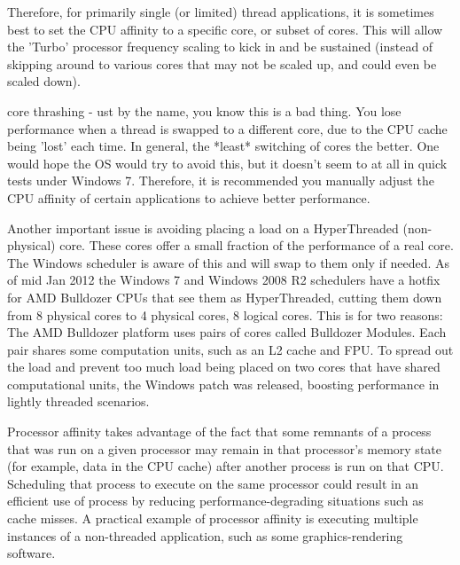 \documentclass[final_report.tex]{subfiles}
\begin{document}
Therefore, for primarily single (or limited) thread applications, it is sometimes best to set the CPU affinity to a specific core, or subset of cores. This will allow the 'Turbo' processor frequency scaling to kick in and be sustained (instead of skipping around to various cores that may not be scaled up, and could even be scaled down).

core thrashing - ust by the name, you know this is a bad thing. You lose performance when a thread is swapped to a different core, due to the CPU cache being 'lost' each time. In general, the *least* switching of cores the better. One would hope the OS would try to avoid this, but it doesn't seem to at all in quick tests under Windows 7. Therefore, it is recommended you manually adjust the CPU affinity of certain applications to achieve better performance.

Another important issue is avoiding placing a load on a HyperThreaded (non-physical) core. These cores offer a small fraction of the performance of a real core. The Windows scheduler is aware of this and will swap to them only if needed. As of mid Jan 2012 the Windows 7 and Windows 2008 R2 schedulers have a hotfix for AMD Bulldozer CPUs that see them as HyperThreaded, cutting them down from 8 physical cores to 4 physical cores, 8 logical cores. This is for two reasons: The AMD Bulldozer platform uses pairs of cores called Bulldozer Modules. Each pair shares some computation units, such as an L2 cache and FPU. To spread out the load and prevent too much load being placed on two cores that have shared computational units, the Windows patch was released, boosting performance in lightly threaded scenarios.

Processor affinity takes advantage of the fact that some remnants of a process that was run on a given processor may remain in that processor's memory state (for example, data in the CPU cache) after another process is run on that CPU. Scheduling that process to execute on the same processor could result in an efficient use of process by reducing performance-degrading situations such as cache misses. A practical example of processor affinity is executing multiple instances of a non-threaded application, such as some graphics-rendering software.
\end{document}
